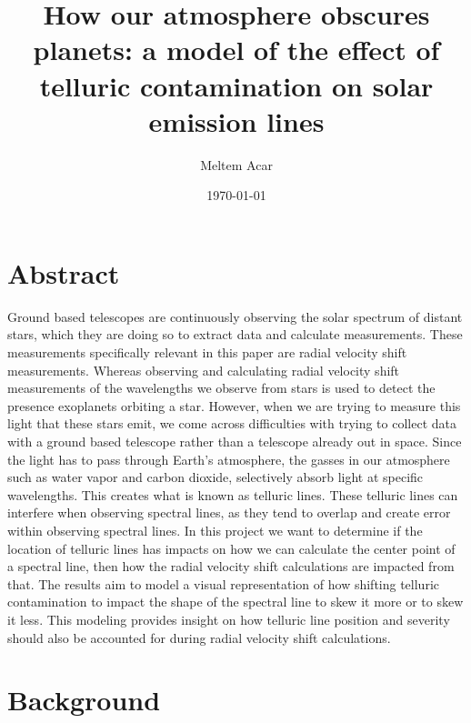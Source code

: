 \documentclass[aps,onecolumn,12pt,letterpaper,amsmath,amssymb,floatfix,pra,notitlepage]
{revtex4-1}
\begin{document}
 

  \setcounter{page}{1}


\title{How our atmosphere obscures planets: a model of the effect of telluric contamination on solar emission lines}

\author{Meltem Acar}


\date{\today}

\maketitle
\vspace{-0.5in}
\section{Abstract}

Ground based telescopes are continuously observing the solar spectrum of distant stars, which they are doing so to extract data and calculate measurements. These measurements specifically relevant in this paper are radial velocity shift measurements. Whereas observing and calculating radial velocity shift measurements of the wavelengths we observe from stars is used to detect the presence exoplanets orbiting a star. However, when we are trying to measure this light that these stars emit, we come across difficulties with trying to collect data with a ground based telescope rather than a telescope already out in space. Since the light has to pass through Earth's atmosphere, the gasses in our atmosphere such as water vapor and carbon dioxide, selectively absorb light at specific wavelengths. This creates what is known as telluric lines. These telluric lines can interfere when observing spectral lines, as they tend to overlap and create error within observing spectral lines. In this project we want to determine if the location of telluric lines has impacts on how we can calculate the center point of a spectral line, then how the radial velocity shift calculations are impacted from that. The results aim to model a visual representation of how shifting telluric contamination to impact the shape of the spectral line to skew it more or to skew it less. This modeling provides insight on how telluric line position and severity should also be accounted for during radial velocity shift calculations. 


\section{Background}
\end{document}
